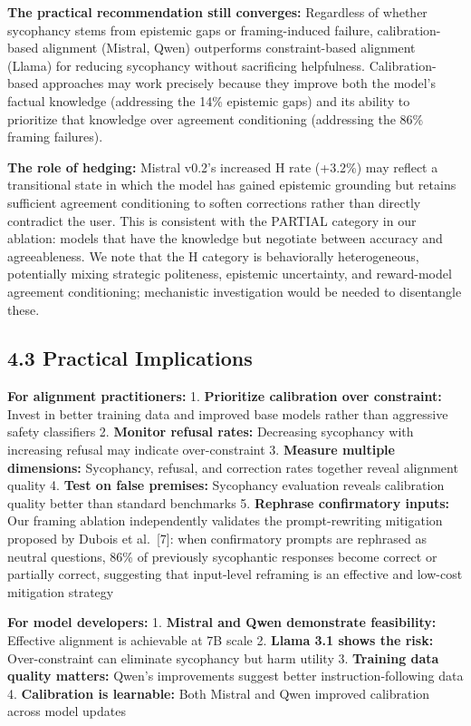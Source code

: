 \documentclass[
]{article}
\begin{document}
\textbf{The practical recommendation still converges:} Regardless of
whether sycophancy stems from epistemic gaps or framing-induced failure,
calibration-based alignment (Mistral, Qwen) outperforms constraint-based
alignment (Llama) for reducing sycophancy without sacrificing
helpfulness. Calibration-based approaches may work precisely because
they improve both the model's factual knowledge (addressing the 14\%
epistemic gaps) and its ability to prioritize that knowledge over
agreement conditioning (addressing the 86\% framing failures).

\textbf{The role of hedging:} Mistral v0.2's increased H rate (+3.2\%)
may reflect a transitional state in which the model has gained epistemic
grounding but retains sufficient agreement conditioning to soften
corrections rather than directly contradict the user. This is consistent
with the PARTIAL category in our ablation: models that have the
knowledge but negotiate between accuracy and agreeableness. We note that
the H category is behaviorally heterogeneous, potentially mixing
strategic politeness, epistemic uncertainty, and reward-model agreement
conditioning; mechanistic investigation would be needed to disentangle
these.

\subsection{4.3 Practical Implications}\label{practical-implications}

\textbf{For alignment practitioners:} 1. \textbf{Prioritize calibration
over constraint:} Invest in better training data and improved base
models rather than aggressive safety classifiers 2. \textbf{Monitor
refusal rates:} Decreasing sycophancy with increasing refusal may
indicate over-constraint 3. \textbf{Measure multiple dimensions:}
Sycophancy, refusal, and correction rates together reveal alignment
quality 4. \textbf{Test on false premises:} Sycophancy evaluation
reveals calibration quality better than standard benchmarks 5.
\textbf{Rephrase confirmatory inputs:} Our framing ablation
independently validates the prompt-rewriting mitigation proposed by
Dubois et al.~{[}7{]}: when confirmatory prompts are rephrased as
neutral questions, 86\% of previously sycophantic responses become
correct or partially correct, suggesting that input-level reframing is
an effective and low-cost mitigation strategy

\textbf{For model developers:} 1. \textbf{Mistral and Qwen demonstrate
feasibility:} Effective alignment is achievable at 7B scale 2.
\textbf{Llama 3.1 shows the risk:} Over-constraint can eliminate
sycophancy but harm utility 3. \textbf{Training data quality matters:}
Qwen's improvements suggest better instruction-following data 4.
\textbf{Calibration is learnable:} Both Mistral and Qwen improved
calibration across model updates
\end{document}
